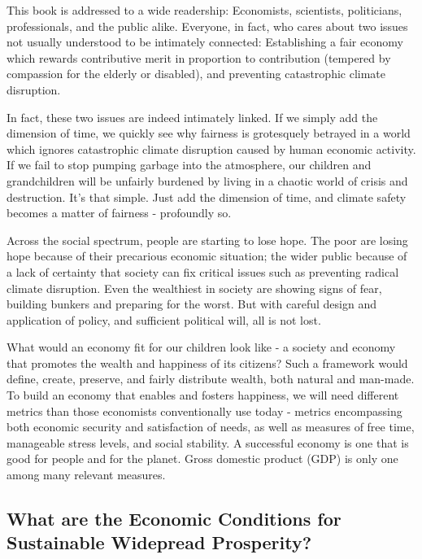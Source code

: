\documentclass[]{tufte-handout}
\begin{document}
This book is addressed to a wide readership: Economists, scientists,
politicians, professionals, and the public alike. Everyone, in fact, who
cares about two issues not usually understood to be intimately
connected: Establishing a fair economy which rewards contributive merit
in proportion to contribution (tempered by compassion for the elderly or
disabled), and preventing catastrophic climate disruption.

In fact, these two issues are indeed intimately linked. If we simply add
the dimension of time, we quickly see why fairness is grotesquely
betrayed in a world which ignores catastrophic climate disruption caused
by human economic activity. If we fail to stop pumping garbage into the
atmosphere, our children and grandchildren will be unfairly burdened by
living in a chaotic world of crisis and destruction. It's that simple.
Just add the dimension of time, and climate safety becomes a matter of
fairness - profoundly so.

Across the social spectrum, people are starting to lose hope. The poor
are losing hope because of their precarious economic situation; the
wider public because of a lack of certainty that society can fix
critical issues such as preventing radical climate disruption. Even the
wealthiest in society are showing signs of fear, building bunkers and
preparing for the worst. But with careful design and application of
policy, and sufficient political will, all is not lost.

What would an economy fit for our children look like - a society and
economy that promotes the wealth and happiness of its citizens? Such a
framework would define, create, preserve, and fairly distribute wealth,
both natural and man-made. To build an economy that enables and fosters
happiness, we will need different metrics than those economists
conventionally use today - metrics encompassing both economic security
and satisfaction of needs, as well as measures of free time, manageable
stress levels, and social stability. A successful economy is one that is
good for people and for the planet. Gross domestic product (GDP) is only
one among many relevant measures.

\hypertarget{what-are-the-economic-conditions-for-sustainable-widepread-prosperity}{%
\subsection{What are the Economic Conditions for Sustainable Widepread
Prosperity?}\label{what-are-the-economic-conditions-for-sustainable-widepread-prosperity}}
\end{document}
